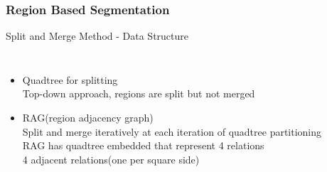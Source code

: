 \documentclass{beamer}
\begin{document}
\begin{frame}
\frametitle{Region Based Segmentation}
\begin{block}{Split and Merge Method - Data Structure}
\begin{columns}
\begin{itemize}
\item \footnotesize{Quadtree for splitting}\\
\scriptsize{Top-down approach, regions are split but not merged}
\item \footnotesize{RAG(region adjacency graph)}\\
\scriptsize{Split and merge iteratively at each iteration of quadtree partitioning\\
RAG has quadtree embedded that represent 4 relations\\
4 adjacent relations(one per square side)}
\end{itemize}
\end{columns}
\end{block}
\end{frame}
\end{document}
